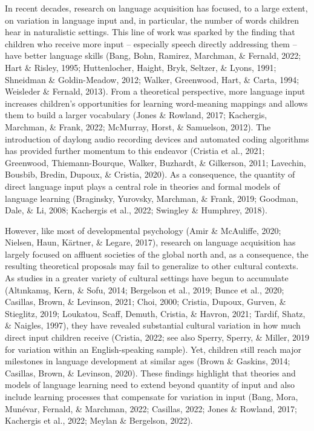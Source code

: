 \documentclass[
  man,floatsintext]{apa6}
\begin{document}
In recent decades, research on language acquisition has focused, to a large extent, on variation in language input and, in particular, the number of words children hear in naturalistic settings. This line of work was sparked by the finding that children who receive more input -- especially speech directly addressing them -- have better language skills (Bang, Bohn, Ramirez, Marchman, \& Fernald, 2022; Hart \& Risley, 1995; Huttenlocher, Haight, Bryk, Seltzer, \& Lyons, 1991; Shneidman \& Goldin-Meadow, 2012; Walker, Greenwood, Hart, \& Carta, 1994; Weisleder \& Fernald, 2013). From a theoretical perspective, more language input increases children's opportunities for learning word-meaning mappings and allows them to build a larger vocabulary (Jones \& Rowland, 2017; Kachergis, Marchman, \& Frank, 2022; McMurray, Horst, \& Samuelson, 2012). The introduction of daylong audio recording devices and automated coding algorithms has provided further momentum to this endeavor (Cristia et al., 2021; Greenwood, Thiemann-Bourque, Walker, Buzhardt, \& Gilkerson, 2011; Lavechin, Bousbib, Bredin, Dupoux, \& Cristia, 2020). As a consequence, the quantity of direct language input plays a central role in theories and formal models of language learning (Braginsky, Yurovsky, Marchman, \& Frank, 2019; Goodman, Dale, \& Li, 2008; Kachergis et al., 2022; Swingley \& Humphrey, 2018).

However, like most of developmental psychology (Amir \& McAuliffe, 2020; Nielsen, Haun, Kärtner, \& Legare, 2017), research on language acquisition has largely focused on affluent societies of the global north and, as a consequence, the resulting theoretical proposals may fail to generalize to other cultural contexts. As studies in a greater variety of cultural settings have begun to accumulate (Altınkamış, Kern, \& Sofu, 2014; Bergelson et al., 2019; Bunce et al., 2020; Casillas, Brown, \& Levinson, 2021; Choi, 2000; Cristia, Dupoux, Gurven, \& Stieglitz, 2019; Loukatou, Scaff, Demuth, Cristia, \& Havron, 2021; Tardif, Shatz, \& Naigles, 1997), they have revealed substantial cultural variation in how much direct input children receive (Cristia, 2022; see also Sperry, Sperry, \& Miller, 2019 for variation within an English-speaking sample). Yet, children still reach major milestones in language development at similar ages (Brown \& Gaskins, 2014; Casillas, Brown, \& Levinson, 2020). These findings highlight that theories and models of language learning need to extend beyond quantity of input and also include learning processes that compensate for variation in input (Bang, Mora, Munévar, Fernald, \& Marchman, 2022; Casillas, 2022; Jones \& Rowland, 2017; Kachergis et al., 2022; Meylan \& Bergelson, 2022).
\end{document}
